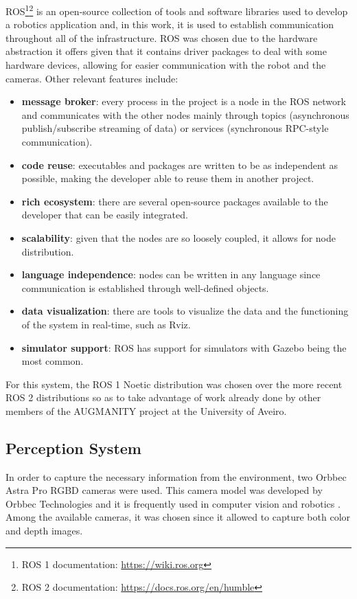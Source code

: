 ROS\cite{ROS2}\footnote{ROS 1 documentation: \url{https://wiki.ros.org}}\footnote{ROS 2 documentation: \url{https://docs.ros.org/en/humble}} is an open-source collection of tools and software libraries used to develop a robotics application and, in this work, it is used to establish communication throughout all of the infrastructure. ROS was chosen due to the hardware abstraction it offers given that it contains driver packages to deal with some hardware devices, allowing for easier communication with the robot and the cameras. Other relevant features include:
\begin{itemize}
    \item \textbf{message broker}: every process in the project is a node in the ROS network and communicates with the other nodes mainly through topics (asynchronous publish/subscribe streaming of data) or services (synchronous RPC-style communication).
    \item \textbf{code reuse}: executables and packages are written to be as independent as possible, making the developer able to reuse them in another project.
    \item \textbf{rich ecosystem}: there are several open-source packages available to the developer that can be easily integrated.
    \item \textbf{scalability}: given that the nodes are so loosely coupled, it allows for node distribution.
    \item \textbf{language independence}: nodes can be written in any language since communication is established through well-defined objects.
    \item \textbf{data visualization}: there are tools to visualize the data and the functioning of the system in real-time, such as Rviz.
    \item \textbf{simulator support}: ROS has support for simulators with Gazebo being the most common.
\end{itemize}

For this system, the ROS 1 Noetic distribution was chosen over the more recent ROS 2 distributions so as to take advantage of work already done by other members of the AUGMANITY project at the University of Aveiro.

\subsection{Perception System}
\label{subsection:perception_system}

In order to capture the necessary information from the environment, two Orbbec Astra Pro RGBD cameras were used. This camera model was developed by Orbbec Technologies and it is frequently used in computer vision and robotics \cite{AstraPro}. Among the available cameras, it was chosen since it allowed to capture both color and depth images.

